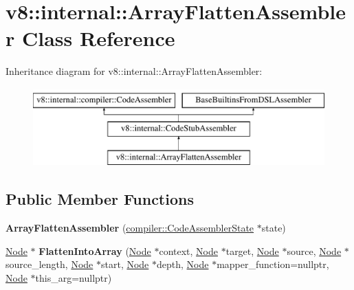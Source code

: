 \hypertarget{classv8_1_1internal_1_1ArrayFlattenAssembler}{}\section{v8\+:\+:internal\+:\+:Array\+Flatten\+Assembler Class Reference}
\label{classv8_1_1internal_1_1ArrayFlattenAssembler}
Inheritance diagram for v8\+:\+:internal\+:\+:Array\+Flatten\+Assembler\+:\begin{figure}[H]
\begin{center}
\leavevmode
\includegraphics[height=3.000000cm]{classv8_1_1internal_1_1ArrayFlattenAssembler}
\end{center}
\end{figure}
\subsection*{Public Member Functions}
\begin{DoxyCompactItemize}
\item 
\mbox{\label{classv8_1_1internal_1_1ArrayFlattenAssembler_ae35c16a89cd51f01d1841c5fb1dd3e91}} 
{\bfseries Array\+Flatten\+Assembler} (\mbox{\hyperlink{classv8_1_1internal_1_1compiler_1_1CodeAssemblerState}{compiler\+::\+Code\+Assembler\+State}} $\ast$state)
\item 
\mbox{\label{classv8_1_1internal_1_1ArrayFlattenAssembler_a154b4ba991438d8e0d1db48b194f2eae}} 
\mbox{\hyperlink{classv8_1_1internal_1_1compiler_1_1Node}{Node}} $\ast$ {\bfseries Flatten\+Into\+Array} (\mbox{\hyperlink{classv8_1_1internal_1_1compiler_1_1Node}{Node}} $\ast$context, \mbox{\hyperlink{classv8_1_1internal_1_1compiler_1_1Node}{Node}} $\ast$target, \mbox{\hyperlink{classv8_1_1internal_1_1compiler_1_1Node}{Node}} $\ast$source, \mbox{\hyperlink{classv8_1_1internal_1_1compiler_1_1Node}{Node}} $\ast$source\+\_\+length, \mbox{\hyperlink{classv8_1_1internal_1_1compiler_1_1Node}{Node}} $\ast$start, \mbox{\hyperlink{classv8_1_1internal_1_1compiler_1_1Node}{Node}} $\ast$depth, \mbox{\hyperlink{classv8_1_1internal_1_1compiler_1_1Node}{Node}} $\ast$mapper\+\_\+function=nullptr, \mbox{\hyperlink{classv8_1_1internal_1_1compiler_1_1Node}{Node}} $\ast$this\+\_\+arg=nullptr)
\end{DoxyCompactItemize}
